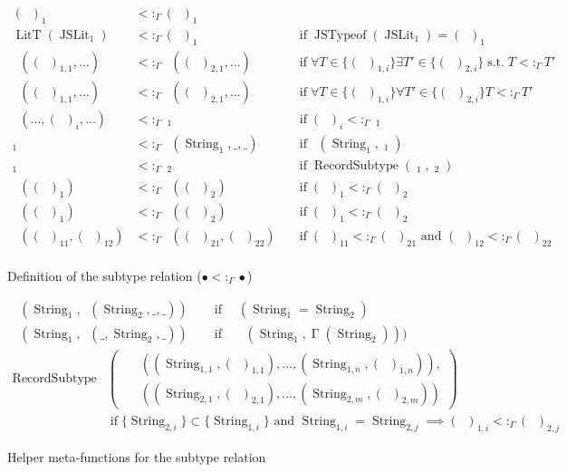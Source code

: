 \documentclass{article}
\DeclareMathOperator{\LitT}{LitT}
\DeclareMathOperator{\JSLit}{JSLit}
\DeclareMathOperator{\JSTypeof}{JSTypeof}
\DeclareMathOperator{\RecT}{RecT_\Gamma}
\DeclareMathOperator{\ObjT}{ObjT_\Gamma}
\DeclareMathOperator{\ListT}{ListT_\Gamma}
\DeclareMathOperator{\SetT}{SetT_\Gamma}
\DeclareMathOperator{\MapT}{MapT_\Gamma}
\DeclareMathOperator{\UnionT}{UnionT_\Gamma}
\DeclareMathOperator{\InterT}{InterT_\Gamma}
\DeclareMathOperator{\LookupObjRef}{\Gamma}
\DeclareMathOperator{\String}{String}
\DeclareMathOperator{\Type}{{Type_\Gamma}}
\DeclareMathOperator{\ObjectSubtype}{ObjectSubtype_\Gamma}
\DeclareMathOperator{\RecordSubtype}{RecordSubtype}
\DeclareMathOperator{\textif}{ if }
\DeclareMathOperator{\suchthat}{s.t.}
\newcommand{\subtype}{<:_\Gamma}
\begin{document}
\begin{figure}
\begin{mdframed}        
\begin{align*}
    (\Type)_1&\subtype(\Type)_1 \\
    \LitT(\JSLit_1)&\subtype(\Type)_1 &&\textif \JSTypeof(\JSLit_1) = (\Type)_1 \\
    \UnionT((\Type)_{1,1}, ...)&\subtype\UnionT((\Type)_{2,1}, ...) 
    &&\textif \forall T\in \{(\Type)_{1,i}\} \exists T' \in \{(\Type)_{2,i}\} \suchthat T\subtype T' \\
    \InterT((\Type)_{1,1}, ...)&\subtype\InterT((\Type)_{2,1}, ...) 
    &&\textif \forall T\in \{(\Type)_{1,i}\} \forall T' \in \{(\Type)_{2,i}\} T\subtype T' \\
    \InterT(..., (\Type)_i, ...)&\subtype\ObjT_1 &&\textif (\Type)_i\subtype\ObjT_1  \\
    \ObjT_1 &\subtype \ObjT(\String_1, \_, \_) &&\textif \ObjectSubtype(\String_1, \ObjT_1)\\
    \RecT_1&\subtype\RecT_2 &&\textif \RecordSubtype(\RecT_1, \RecT_2) \\
    \ListT((\Type)_1)&\subtype\ListT((\Type)_2) &&\textif (\Type)_1\subtype(\Type)_2 \\
    \SetT((\Type)_1)&\subtype\SetT((\Type)_2) &&\textif (\Type)_1\subtype(\Type)_2 \\
    \MapT((\Type)_{11}, (\Type)_{12})&\subtype\MapT((\Type)_{21}, (\Type)_{22}) &&\textif (\Type)_{11}\subtype(\Type)_{21} \text{ and } (\Type)_{12}\subtype(\Type)_{22} \\
\end{align*}
\end{mdframed}        
\caption{Definition of the subtype relation (\(\bullet\subtype\bullet\))}
\label{subtype-definitions}
\end{figure}
\begin{figure}
\begin{mdframed}        
\begin{align*}
    \ObjectSubtype(\String_1, \ObjT(\String_2,\_, \_)) \quad &\textif 
    \quad (\String_1 = \String_2)\\
    \ObjectSubtype(\String_1, \ObjT(\_,\String_2, \_)) \quad &\textif 
    \quad \ObjectSubtype(\String_1, \LookupObjRef(\String_2)))
\end{align*}
\begin{align*}
    \RecordSubtype &\left(\begin{aligned}
        &\RecT((\String_{1,1}, (\Type)_{1, 1}), ..., (\String_{1,n}, (\Type)_{1, n})), \\
        &\RecT((\String_{2,1}, (\Type)_{2, 1}), ..., (\String_{2,m}, (\Type)_{2, m}))
    \end{aligned}\right) \\
    &\textif \{\String_{2,i}\} \subset \{\String_{1,i}\} \text{ and } \String_{1, i} = \String_{2, j} \implies (\Type)_{1, i} \subtype (\Type)_{2, j}
\end{align*}
\end{mdframed}        
    \caption{Helper meta-functions for the subtype relation}
\label{subtype-helpers}
\end{figure}
\end{document}

